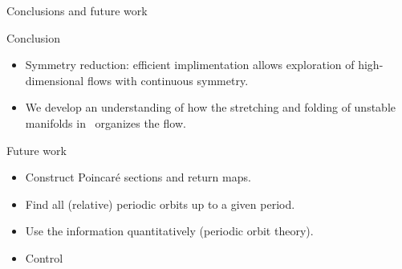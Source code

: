 \documentclass{beamer}
\begin{document}
 \begin{frame}{Conclusions and future work}
 
\begin{block}{Conclusion}
  \begin{itemize}
   \item Symmetry reduction: efficient implimentation allows exploration of high-dimensional flows with continuous symmetry.
   \item We develop an understanding of how the stretching and folding
  	of unstable manifolds in \KSe\ organizes the flow.
  \end{itemize}
\end{block}


\begin{block}{Future work}
\begin{itemize}
  \item Construct Poincar\'e sections and return maps.
  \item Find all (relative) periodic orbits up to a given period.
  \item Use the information quantitatively (periodic orbit theory).
  \item Control
\end{itemize}
\end{block}

\end{frame}

% 
% 
\end{document}
